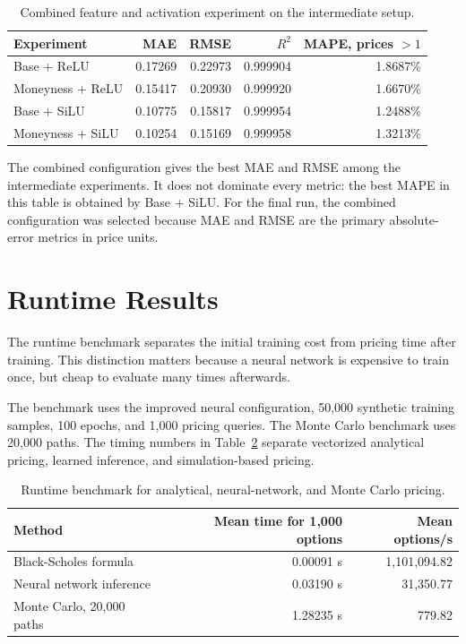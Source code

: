 \begin{table}[H]
    \centering
    \begin{tabular}{lrrrr}
        \toprule
        Experiment & MAE & RMSE & $R^2$ & MAPE, prices $> 1$ \\
        \midrule
        Base + ReLU             & 0.17269 & 0.22973 & 0.999904 & 1.8687\% \\
        Moneyness + ReLU        & 0.15417 & 0.20930 & 0.999920 & 1.6670\% \\
        Base + SiLU             & 0.10775 & 0.15817 & 0.999954 & 1.2488\% \\
        Moneyness + SiLU        & 0.10254 & 0.15169 & 0.999958 & 1.3213\% \\
        \bottomrule
    \end{tabular}
    \caption{Combined feature and activation experiment on the intermediate setup.}
    \label{tab:combined-results}
\end{table}

The combined configuration gives the best MAE and RMSE among the intermediate experiments.
It does not dominate every metric: the best MAPE in this table is obtained by Base + SiLU.
For the final run, the combined configuration was selected because MAE and RMSE are the primary absolute-error metrics in price units.

\section{Runtime Results}

The runtime benchmark separates the initial training cost from pricing time after training.
This distinction matters because a neural network is expensive to train once, but cheap to evaluate many times afterwards.

The benchmark uses the improved neural configuration, 50,000 synthetic training samples, 100 epochs, and 1,000 pricing queries.
The Monte Carlo benchmark uses 20,000 paths.
The timing numbers in Table~\ref{tab:runtime-benchmark} separate vectorized analytical pricing, learned inference, and simulation-based pricing.

\begin{table}[H]
    \centering
    \begin{tabular}{lrr}
        \toprule
        Method                    & Mean time for 1,000 options & Mean options/s \\
        \midrule
        Black-Scholes formula     & 0.00091 s                   & 1,101,094.82   \\
        Neural network inference  & 0.03190 s                   & 31,350.77      \\
        Monte Carlo, 20,000 paths & 1.28235 s                   & 779.82         \\
        \bottomrule
    \end{tabular}
    \caption{Runtime benchmark for analytical, neural-network, and Monte Carlo pricing.}
    \label{tab:runtime-benchmark}
\end{table}

